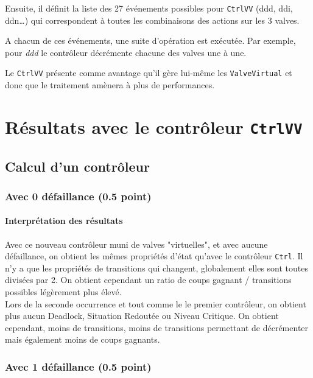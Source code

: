 \documentclass[a4paper]{book}
\begin{document}
Ensuite, il définit la liste des 27 événements possibles pour {\tt CtrlVV} (ddd, ddi, ddn\dots) qui correspondent à toutes les 
combinaisons des actions sur les 3 valves.

A chacun de ces événements, une suite d'opération est exécutée. Par exemple, pour \textit{ddd} le contrôleur décrémente chacune des 
valves une à une.

Le {\tt CtrlVV} présente comme avantage qu'il gère lui-même les {\tt ValveVirtual} et donc que le traitement amènera à plus de performances.

\section{Résultats avec le contrôleur {\tt CtrlVV}}
\subsection{Calcul d'un contrôleur}
\subsubsection{Avec 0 défaillance (0.5 point)}



%
%
\paragraph{Interprétation des résultats}
Avec ce nouveau contrôleur muni de valves "virtuelles", et avec aucune défaillance, on obtient les mêmes
propriétés d'état qu'avec le contrôleur {\tt Ctrl}. Il n'y a que les propriétés de transitions qui changent, 
globalement elles sont toutes divisées par 2. On obtient cependant un ratio de coups gagnant / transitions possibles légèrement plus élevé.  \\
Lors de la seconde occurrence et tout comme le le premier contrôleur, on obtient plus aucun Deadlock, Situation Redoutée ou Niveau Critique. 
On obtient cependant, moins de transitions, moins de transitions permettant de décrémenter mais également moins de coups gagnants.

\subsubsection{Avec 1 défaillance (0.5 point)}





\end{document}

